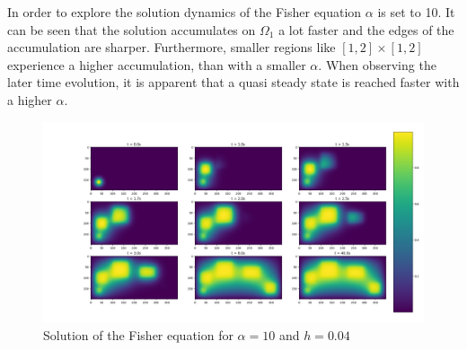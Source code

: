 \documentclass{article}
\begin{document}
In order to explore the solution dynamics of the Fisher equation $\alpha$ is set to 10. It can be seen that the solution accumulates on $\Omega_1$ a lot faster and the edges of the accumulation are sharper. Furthermore, smaller regions like $\left[1,2\right]\times\left[1,2\right]$ experience a higher accumulation, than with a smaller $\alpha$. When observing the later time evolution, it is apparent that a quasi steady state is reached faster with a higher $\alpha$.
\begin{figure}[H]
	\centering
	\includegraphics[width=.9\linewidth]{4solutiondynamics.png}
	\caption{Solution of the Fisher equation for $\alpha=10$ and $h=0.04$}
\end{figure}
\end{document}
